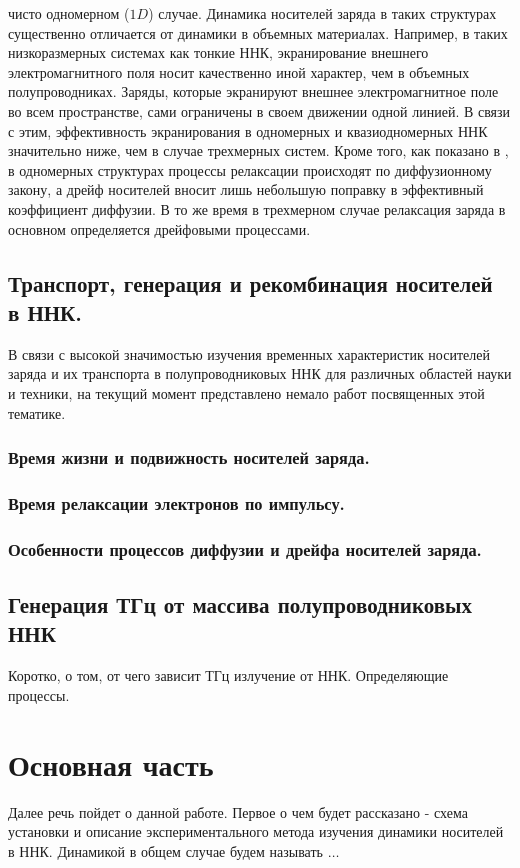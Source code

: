 \documentclass[a4paper,14pt,russian]{extreport}
\begin{document}
чисто одномерном ($1D$) случае. Динамика носителей заряда в таких структурах существенно отличается от динамики в объемных материалах. Например, в таких низкоразмерных системах как тонкие ННК, экранирование внешнего электромагнитного поля носит качественно иной характер, чем в объемных полупроводниках. Заряды, которые экранируют внешнее электромагнитное поле во всем пространстве, сами ограничены в своем движении одной линией. В связи с этим, эффективность экранирования в одномерных и квазиодномерных ННК значительно ниже, чем в случае трехмерных систем. Кроме того, как показано в \cite{SiliconNWContactPhenomena}, в одномерных структурах процессы релаксации происходят по диффузионному закону, а дрейф носителей вносит лишь небольшую поправку в эффективный коэффициент диффузии. В то же время в трехмерном случае релаксация заряда в основном определяется дрейфовыми процессами.\par

		\section{Транспорт, генерация и рекомбинация носителей в ННК.}
			В связи с высокой значимостью изучения временных характеристик носителей заряда и их транспорта в полупроводниковых ННК для различных областей науки и техники, на текущий момент представлено немало работ посвященных этой тематике.
			\subsection{Время жизни и подвижность носителей заряда.}
				
			\subsection{Время релаксации электронов по импульсу.}
			\subsection{Особенности процессов диффузии и дрейфа носителей заряда.}

		\section{Генерация ТГц от массива полупроводниковых ННК}
			Коротко, о том, от чего зависит ТГц излучение от ННК. Определяющие процессы.
			
	\chapter{Основная часть}
			Далее речь пойдет о данной работе. Первое о чем будет рассказано - схема установки и описание экспериментального метода изучения динамики носителей в ННК. Динамикой в общем случае будем называть $\ldots$
			\newpage
\end{document}
